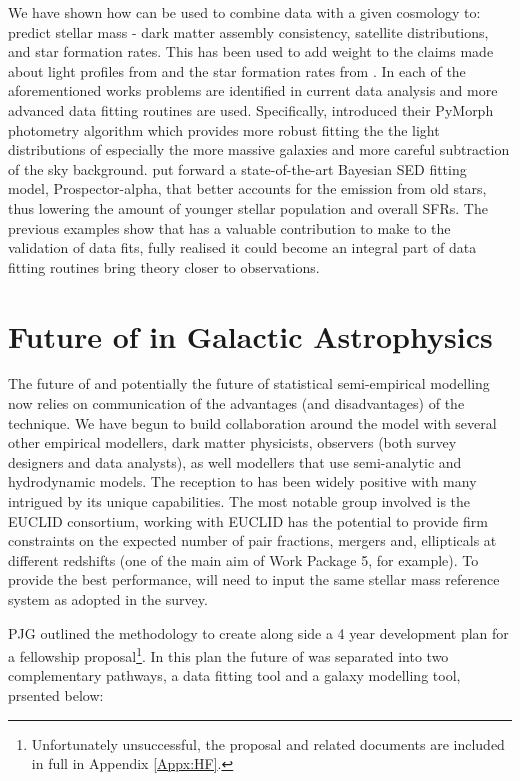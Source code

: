 We have shown how \steel can be used to combine data with a given cosmology to: predict stellar mass - dark matter assembly consistency, satellite distributions, and star formation rates. This has been used to add weight to the claims made about light profiles from \citet{Bernardi2017ComparingLight} and the star formation rates from \citet{Leja2019AnSurvey}. In each of the aforementioned works problems are identified in current data analysis and more advanced data fitting routines are used. Specifically, \citet{Bernardi2017ComparingLight}  introduced their PyMorph photometry algorithm which provides more robust fitting the the light distributions of especially the more massive galaxies and more careful subtraction of the sky background. \citet{Leja2019AnSurvey} put forward a state-of-the-art Bayesian SED fitting model, Prospector-alpha, that better accounts for the emission from old stars, thus lowering the amount of younger stellar population and overall SFRs. The previous examples show that \steel has a valuable contribution to make to the validation of data fits, fully realised it could become an integral part of data fitting routines bring theory closer to observations.

\section{Future of \steel in Galactic Astrophysics}
\label{sec:Future}

The future of \steel and potentially the future of statistical semi-empirical modelling now relies on communication of the advantages (and disadvantages) of the technique. We have begun to build collaboration around the model with several other empirical modellers, dark matter physicists, observers (both survey designers and data analysts), as well modellers that use semi-analytic and hydrodynamic models. The reception to \steel has been widely positive with many intrigued by its unique capabilities. The most notable group involved is the EUCLID consortium, working with EUCLID \steel has the potential to provide firm constraints on the expected number of pair fractions, mergers and, ellipticals at different redshifts (one of the main aim of Work Package 5, for example). To provide the best performance, \steel will need to input the same stellar mass reference system as adopted in the survey.

PJG outlined the methodology to create \steel along side a 4 year development plan for a fellowship proposal\footnote{Unfortunately unsuccessful, the proposal and related documents are included in full in Appendix \ref{Appx:HF}.}. In this plan the future of \steel was separated into two complementary pathways, a data fitting tool and a galaxy modelling tool, prsented below:

